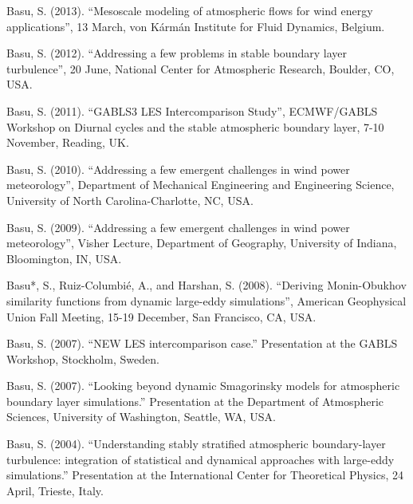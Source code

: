 \begin{etaremune}[topsep=0pt,itemsep=0pt,partopsep=0pt,parsep=0pt]
    \item Basu, S. (2013). ``Mesoscale modeling of atmospheric flows for wind energy applications'', 13 March, von Kármán Institute for Fluid Dynamics, Belgium. 
    \item Basu, S. (2012). ``Addressing a few problems in stable boundary layer turbulence'', 20 June, National Center for Atmospheric Research, Boulder, CO, USA.
    \item Basu, S. (2011). ``GABLS3 LES Intercomparison Study'', ECMWF/GABLS Workshop on Diurnal cycles and the stable atmospheric boundary layer, 7-10 November, Reading, UK.
    \item Basu, S. (2010). ``Addressing a few emergent challenges in wind power meteorology'', Department of Mechanical Engineering and Engineering Science, University of North Carolina-Charlotte, NC, USA.
    \item Basu, S. (2009). ``Addressing a few emergent challenges in wind power meteorology'', Visher Lecture, Department of Geography, University of Indiana, Bloomington, IN, USA. 
    \item Basu*, S., Ruiz-Columbi\'{e}, A., and Harshan, S. (2008). ``Deriving Monin-Obukhov similarity functions from dynamic large-eddy simulations'', American Geophysical Union Fall Meeting, 15-19 December, San Francisco, CA, USA. 
    \item Basu, S. (2007). ``NEW LES intercomparison case.'' Presentation at the GABLS Workshop, Stockholm, Sweden.
    \item Basu, S. (2007). ``Looking beyond dynamic Smagorinsky models for atmospheric boundary layer simulations.'' Presentation at the Department of Atmospheric Sciences, University of Washington, Seattle, WA, USA.
    \item Basu, S. (2004). ``Understanding stably stratified atmospheric boundary-layer turbulence: integration of statistical and dynamical approaches with large-eddy simulations.'' Presentation at the International Center for Theoretical Physics, 24 April, Trieste, Italy.
\end{etaremune}